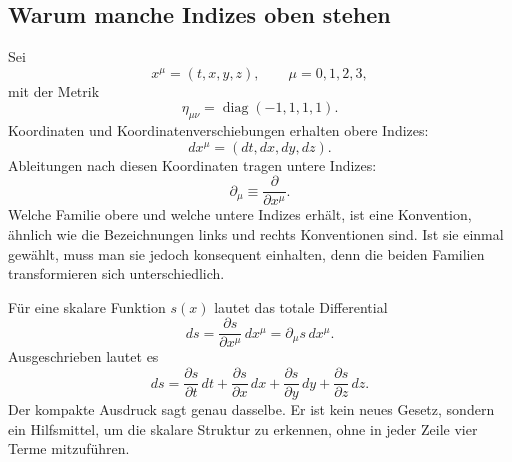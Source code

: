 \subsection{Warum manche Indizes oben stehen}

Sei
\begin{equation}
x^\mu=(t,x,y,z),
\qquad
\mu=0,1,2,3,
\end{equation}
mit der Metrik
\begin{equation}
\eta_{\mu\nu}
=
\operatorname{diag}(-1,1,1,1).
\label{eq:sr7-metric}
\end{equation}
Koordinaten und Koordinatenverschiebungen erhalten obere Indizes:
\begin{equation}
dx^\mu=(dt,dx,dy,dz).
\end{equation}
Ableitungen nach diesen Koordinaten tragen untere Indizes:
\begin{equation}
\partial_\mu
\equiv
\frac{\partial}{\partial x^\mu}.
\label{eq:sr7-gradient}
\end{equation}
Welche Familie obere und welche untere Indizes erhält, ist eine Konvention, ähnlich wie die Bezeichnungen links und rechts Konventionen sind. Ist sie einmal gewählt, muss man sie jedoch konsequent einhalten, denn die beiden Familien transformieren sich unterschiedlich.

\begin{classroomqa}
\end{classroomqa}

Für eine skalare Funktion \(s(x)\) lautet das totale Differential
\begin{equation}
ds
=
\frac{\partial s}{\partial x^\mu}\,dx^\mu
=
\partial_\mu s\,dx^\mu.
\label{eq:sr7-total-differential}
\end{equation}
Ausgeschrieben lautet es
\begin{equation}
ds
=
\frac{\partial s}{\partial t}\,dt
+\frac{\partial s}{\partial x}\,dx
+\frac{\partial s}{\partial y}\,dy
+\frac{\partial s}{\partial z}\,dz.
\end{equation}
Der kompakte Ausdruck sagt genau dasselbe. Er ist kein neues Gesetz, sondern ein Hilfsmittel, um die skalare Struktur zu erkennen, ohne in jeder Zeile vier Terme mitzuführen.


